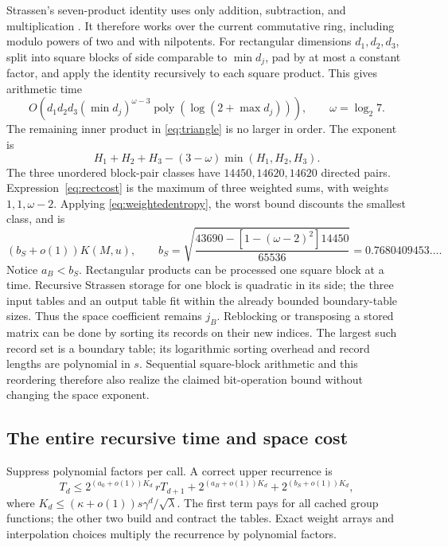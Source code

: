 \documentclass[11pt,letterpaper]{article}
\theoremstyle{definition}\newtheorem{definition}[theorem]{Definition}
\theoremstyle{remark}\newtheorem{remark}[theorem]{Remark}
\newcommand{\poly}{\operatorname{poly}}
\begin{document}
Strassen's seven-product identity uses only addition, subtraction, and
multiplication \cite{strassen}. It therefore works over the current
commutative ring, including modulo powers of two and with nilpotents.
For rectangular dimensions $d_1,d_2,d_3$, split into square blocks of side
comparable to $\min d_j$, pad by at most a constant factor, and apply the
identity recursively to each square product. This gives arithmetic time
\[
 O\left(d_1d_2d_3(\min d_j)^{\omega-3}
              \poly(\log(2+\max d_j))\right),\qquad\omega=\log_2 7.
\]
The remaining inner product in \eqref{eq:triangle} is no larger in order.
The exponent is
\begin{equation}\label{eq:rectcost}
 H_1+H_2+H_3-(3-\omega)\min(H_1,H_2,H_3).
\end{equation}
The three unordered block-pair classes have $14450,14620,14620$
directed pairs. Expression~\eqref{eq:rectcost} is the maximum of three
weighted sums, with weights $1,1,\omega-2$. Applying
\eqref{eq:weightedentropy}, the worst bound discounts the smallest class,
and is
\[
 (b_S+o(1))K(M,u),\qquad
 b_S=\sqrt{\frac{43690-[1-(\omega-2)^2]14450}{65536}}
 =0.7680409453\ldots .
\]
Notice $a_B<b_S$. Rectangular products can be processed one square block
at a time. Recursive Strassen storage for one block is quadratic in its
side; the three input tables and an output table fit within the already
bounded boundary-table sizes. Thus the space coefficient remains $j_B$.
Reblocking or transposing a stored matrix can be done by sorting its records
on their new indices. The largest such record set is a boundary table;
its logarithmic sorting overhead and record lengths are polynomial in $s$.
Sequential square-block arithmetic and this reordering therefore also
realize the claimed bit-operation bound without changing the space exponent.

\subsection{The entire recursive time and space cost}

Suppress polynomial factors per call. A correct upper recurrence is
\begin{equation}\label{eq:fastrec}
 T_d\le 2^{(a_0+o(1))K_d}\,rT_{d+1}
          +2^{(a_B+o(1))K_d}+2^{(b_S+o(1))K_d},
\end{equation}
where $K_d\le(\kappa+o(1))s\gamma^d/\sqrt\lambda$.
The first term pays for all cached group functions; the other two build and
contract the tables. Exact weight arrays and interpolation choices multiply
the recurrence by polynomial factors.
\end{document}
